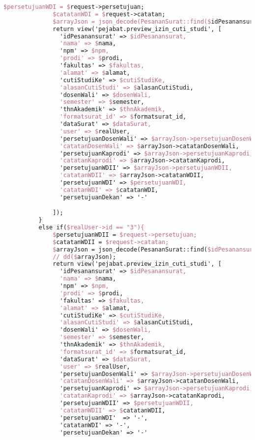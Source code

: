 \begin{lstlisting}[language=tex,basicstyle=\tiny,caption=PesanansuratController.php]
              $persetujuanWDI = $request->persetujuan;
              $catatanWDI = $request->catatan;
              $arrayJson = json_decode(PesananSurat::find($idPesanansurat)->dataSurat);
              return view('pejabat.preview_izin_cuti_studi', [
                'idPesanansurat' => $idPesanansurat,
                'nama' => $nama,
                'npm' => $npm,
                'prodi' => $prodi,
                'fakultas' => $fakultas,
                'alamat' => $alamat,
                'cutiStudiKe' => $cutiStudiKe,
                'alasanCutiStudi' => $alasanCutiStudi,
                'dosenWali' => $dosenWali,
                'semester' => $semester,
                'thnAkademik' => $thnAkademik,
                'formatsurat_id' => $formatsurat_id,
                'dataSurat' => $dataSurat,
                'user' => $realUser,
                'persetujuanDosenWali' => $arrayJson->persetujuanDosenWali,
                'catatanDosenWali' => $arrayJson->catatanDosenWali,
                'persetujuanKaprodi' => $arrayJson->persetujuanKaprodi,
                'catatanKaprodi' => $arrayJson->catatanKaprodi,
                'persetujuanWDII' => $arrayJson->persetujuanWDII,
                'catatanWDII' => $arrayJson->catatanWDII,
                'persetujuanWDI' => $persetujuanWDI,
                'catatanWDI' => $catatanWDI,
                'persetujuanDekan' => '-'

              ]);
          }
          else if($realUser->id == "3"){
              $persetujuanWDII = $request->persetujuan;
              $catatanWDII = $request->catatan;
              $arrayJson = json_decode(PesananSurat::find($idPesanansurat)->dataSurat);
              // dd($arrayJson);
              return view('pejabat.preview_izin_cuti_studi', [
                'idPesanansurat' => $idPesanansurat,
                'nama' => $nama,
                'npm' => $npm,
                'prodi' => $prodi,
                'fakultas' => $fakultas,
                'alamat' => $alamat,
                'cutiStudiKe' => $cutiStudiKe,
                'alasanCutiStudi' => $alasanCutiStudi,
                'dosenWali' => $dosenWali,
                'semester' => $semester,
                'thnAkademik' => $thnAkademik,
                'formatsurat_id' => $formatsurat_id,
                'dataSurat' => $dataSurat,
                'user' => $realUser,
                'persetujuanDosenWali' => $arrayJson->persetujuanDosenWali,
                'catatanDosenWali' => $arrayJson->catatanDosenWali,
                'persetujuanKaprodi' => $arrayJson->persetujuanKaprodi,
                'catatanKaprodi' => $arrayJson->catatanKaprodi,
                'persetujuanWDII' => $persetujuanWDII,
                'catatanWDII' => $catatanWDII,
                'persetujuanWDI'  => '-',
                'catatanWDI' => '-',
                'persetujuanDekan' => '-'


\end{lstlisting}
